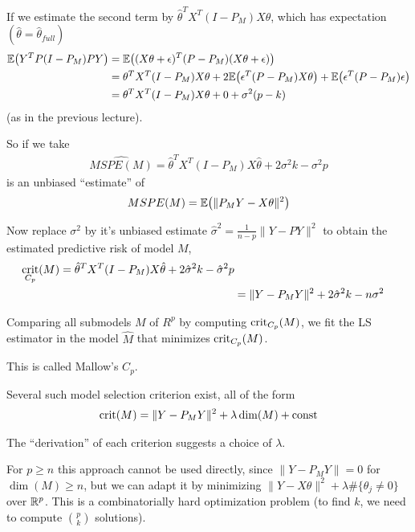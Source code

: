 If we estimate the second term by $\hat \theta^{T} X^{T} (I - P_{M}) X
\hat \theta$, which has expectation $(\hat \theta = \hat
\theta_{full})$
\begin{align}
  \label{eq:108}
  \E{Y^{T} P(I - P_{M})PY} &= \E{(X\theta + \epsilon)^{T} (P - P_{M})
    (X \theta + \epsilon)} \\
  &= \theta^{T} X^{T} (I - P_{M}) X \theta + 2 \E{\epsilon^{T}(P -
    P_{M}) X \theta} + \E{\epsilon^{T}(P - P_{M}) \epsilon} \\
  &= \theta^{T} X^{T} (I - P_{M}) X \theta + 0 + \sigma^{2} ( p - k)
\end{align} (as in the previous lecture).

So if we take
\begin{align}
  \label{eq:109}
  \hat{MSPE(M)} = \hat \theta^{T} X^{T}(I - P_{M}) X \hat \theta + 2
  \sigma^{2} k - \sigma^{2} p
\end{align} is an unbiased ``estimate'' of
\begin{align}
  \label{eq:110}
  MSPE(M) = \E{\| P_{M}Y - X \theta \|^{2}}
\end{align}

Now replace $\sigma^{2}$ by it's unbiased estimate $\hat \sigma^{2} =
\frac{1}{n-p} \| Y - PY \|^{2}$ to obtain the estimated predictive
risk of model $M$,
\begin{align}
  \label{eq:111}
  \operatorname*{crit}_{C_{p}} (M) = \hat \theta^{T} X^{T} (I - P_{M})X \hat \theta +
  2 \hat \sigma^{2} k - \hat \sigma^{2} p \\
  &= \| Y - P_{M} Y \|^{2} + 2 \hat \sigma^{2} k - n \sigma^{2}
\end{align}

Comparing all submodels $M$ of $R^{p}$ by computing
$\operatorname*{crit}_{C_{p}}(M)$, we fit the LS estimator in the model $\hat M$ that
minimizes $\operatorname*{crit}_{C_{p}}(M)$.

This is called Mallow's $C_{p}$.

Several such model selection criterion exist, all of the form
\begin{align}
  \label{eq:112}
  \operatorname*{crit}(M) = \| Y - P_{M} Y \|^{2} + \lambda \dim(M) + \text{const}
\end{align}

The ``derivation'' of each criterion suggests a choice of $\lambda$.

For $p \geq n$ this approach cannot be used directly, since $\| Y - P_{M}
Y \| = 0$ for $\dim(M) \geq n$, but we can adapt it by minimizing $\|
Y - X \theta \|^{2} + \lambda \#\{\theta_{j} \neq 0 \}$ over $\mathbb{R}^{p}$.
This is a combinatorially hard optimization problem (to find $k$, we
need to compute $p \choose k$ solutions).

